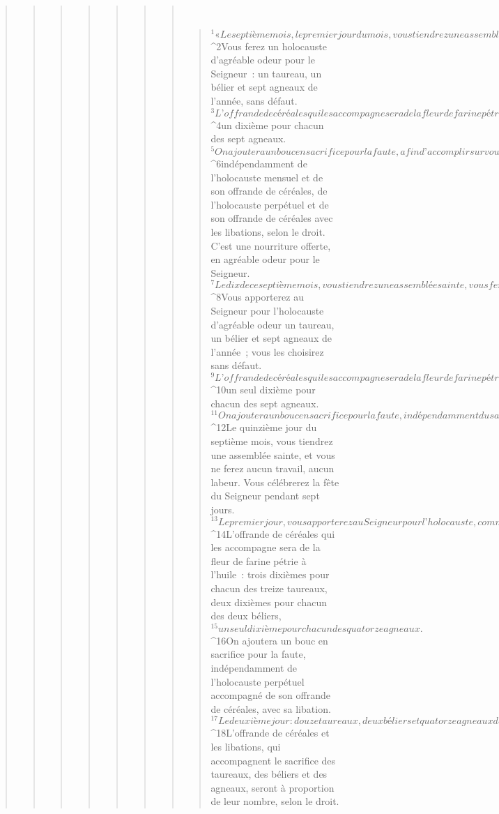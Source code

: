 \begin{verse}
\begin{verse}
\begin{verse}
\begin{verse}
\begin{verse}
\begin{verse}
\begin{verse}
         
      \bchapter{}
      \begin{verse}
${}^{1}« Le septième mois, le premier jour du mois, vous tiendrez une assemblée sainte. Vous ne ferez aucun travail, aucun labeur. Ce sera pour vous un jour d’ovations. 
${}^{2}Vous ferez un holocauste d’agréable odeur pour le Seigneur : un taureau, un bélier et sept agneaux de l’année, sans défaut. 
${}^{3}L’offrande de céréales qui les accompagne sera de la fleur de farine pétrie à l’huile : trois dixièmes par taureau, deux dixièmes pour le bélier, 
${}^{4}un dixième pour chacun des sept agneaux. 
${}^{5}On ajoutera un bouc en sacrifice pour la faute, afin d’accomplir sur vous le rite d’expiation, 
${}^{6}indépendamment de l’holocauste mensuel et de son offrande de céréales, de l’holocauste perpétuel et de son offrande de céréales avec les libations, selon le droit. C’est une nourriture offerte, en agréable odeur pour le Seigneur.
${}^{7}Le dix de ce septième mois, vous tiendrez une assemblée sainte, vous ferez pénitence et vous ne ferez aucun travail. 
${}^{8}Vous apporterez au Seigneur pour l’holocauste d’agréable odeur un taureau, un bélier et sept agneaux de l’année ; vous les choisirez sans défaut. 
${}^{9}L’offrande de céréales qui les accompagne sera de la fleur de farine pétrie à l’huile : trois dixièmes par taureau, deux dixièmes pour le bélier, 
${}^{10}un seul dixième pour chacun des sept agneaux. 
${}^{11}On ajoutera un bouc en sacrifice pour la faute, indépendamment du sacrifice pour la faute du jour du Grand Pardon, et de l’holocauste perpétuel accompagné de son offrande de céréales, avec les libations.
${}^{12}Le quinzième jour du septième mois, vous tiendrez une assemblée sainte, et vous ne ferez aucun travail, aucun labeur. Vous célébrerez la fête du Seigneur pendant sept jours. 
${}^{13}Le premier jour, vous apporterez au Seigneur pour l’holocauste, comme nourriture offerte en agréable odeur, treize taureaux, deux béliers, quatorze agneaux de l’année ; ils seront sans défaut. 
${}^{14}L’offrande de céréales qui les accompagne sera de la fleur de farine pétrie à l’huile : trois dixièmes pour chacun des treize taureaux, deux dixièmes pour chacun des deux béliers, 
${}^{15}un seul dixième pour chacun des quatorze agneaux. 
${}^{16}On ajoutera un bouc en sacrifice pour la faute, indépendamment de l’holocauste perpétuel accompagné de son offrande de céréales, avec sa libation.
${}^{17}Le deuxième jour : douze taureaux, deux béliers et quatorze agneaux de l’année, sans défaut. 
${}^{18}L’offrande de céréales et les libations, qui accompagnent le sacrifice des taureaux, des béliers et des agneaux, seront à proportion de leur nombre, selon le droit. 

\end{verse}
\end{verse}
\end{verse}
\end{verse}
\end{verse}
\end{verse}
\end{verse}
\end{verse}

